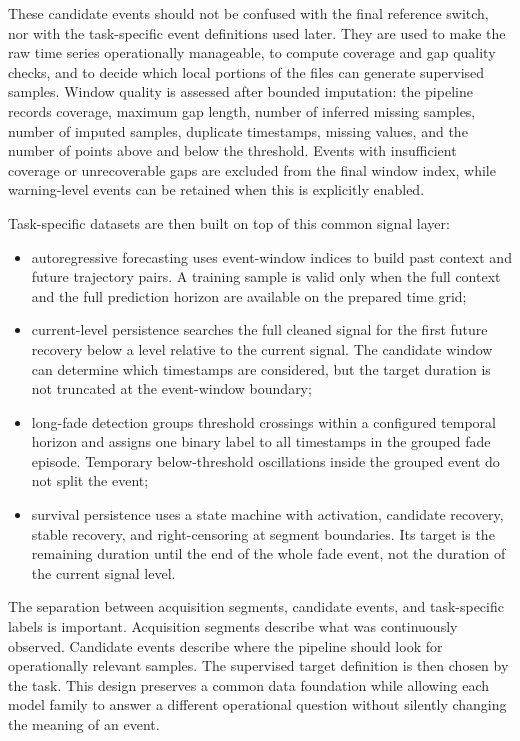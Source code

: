 These candidate events should not be confused with the final reference switch,
nor with the task-specific event definitions used later. They are used to make
the raw time series operationally manageable, to compute coverage and gap
quality checks, and to decide which local portions of the files can generate
supervised samples. Window quality is assessed after bounded imputation: the
pipeline records coverage, maximum gap length, number of inferred missing
samples, number of imputed samples, duplicate timestamps, missing values, and
the number of points above and below the threshold. Events with insufficient
coverage or unrecoverable gaps are excluded from the final window index, while
warning-level events can be retained when this is explicitly enabled.

Task-specific datasets are then built on top of this common signal layer:

\begin{itemize}
  \item autoregressive forecasting uses event-window indices to build past
  context and future trajectory pairs. A training sample is valid only when the
  full context and the full prediction horizon are available on the prepared
  time grid;
  \item current-level persistence searches the full cleaned signal for the
  first future recovery below a level relative to the current signal. The
  candidate window can determine which timestamps are considered, but the target
  duration is not truncated at the event-window boundary;
  \item long-fade detection groups threshold crossings within a configured
  temporal horizon and assigns one binary label to all timestamps in the grouped
  fade episode. Temporary below-threshold oscillations inside the grouped event
  do not split the event;
  \item survival persistence uses a state machine with activation, candidate
  recovery, stable recovery, and right-censoring at segment boundaries. Its
  target is the remaining duration until the end of the whole fade event, not
  the duration of the current signal level.
\end{itemize}

The separation between acquisition segments, candidate events, and task-specific
labels is important. Acquisition segments describe what was continuously
observed. Candidate events describe where the pipeline should look for
operationally relevant samples. The supervised target definition is then chosen
by the task. This design preserves a common data foundation while allowing each
model family to answer a different operational question without silently
changing the meaning of an event.

